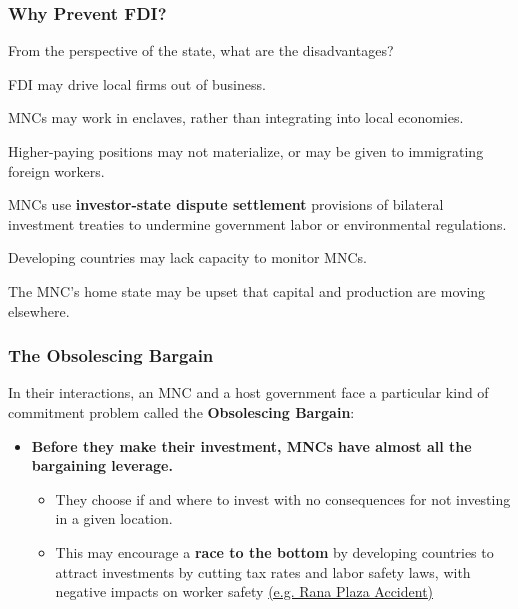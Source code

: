 \documentclass[handout]{beamer}
\begin{document}
\begin{frame} 
	\frametitle{\LARGE{Why Prevent FDI?}}
	From the perspective of the state, what are the disadvantages?
	\begin{itemize}
		\large{
			\item FDI may drive local firms out of business. \pause 
			
			\item MNCs may work in enclaves, rather than integrating into local economies.   \pause
			\item Higher-paying positions may not materialize, or may be given to immigrating foreign workers. \pause 
			
			\item MNCs use \textbf{investor-state dispute settlement} provisions of bilateral investment treaties to undermine government labor or environmental regulations. \pause 
			
			\item Developing countries may lack capacity to monitor MNCs.  \pause 
			
			\item The MNC's home state may be upset that capital and production are moving elsewhere. 
		}
	\end{itemize}
\end{frame}



\begin{frame} 
	\frametitle{\LARGE{The Obsolescing Bargain}}
	In their interactions, an MNC and a host government face a particular kind of commitment problem called the \textbf{Obsolescing Bargain}:
	\begin{itemize}
		\item \textbf{Before they make their investment, MNCs have almost all the bargaining leverage.} \pause 
		\begin{itemize}
			\item They choose if and where to invest with no consequences for not investing in a given location. \pause 
			\item This may encourage a \textbf{race to the bottom} by developing countries to attract investments by cutting tax rates and labor safety laws, with negative impacts on worker safety \href{https://www.ilo.org/global/topics/geip/WCMS_614394/lang--en/index.htm}{(e.g. Rana Plaza Accident)}  
		\end{itemize}
	\end{itemize} 
\end{frame}
\end{document}
